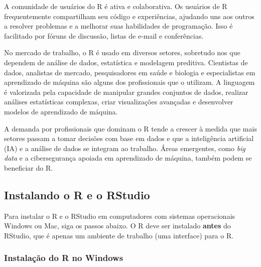 \documentclass[
]{book}
\begin{document}
A comunidade de usuários do R é ativa e colaborativa. Os usuários de R frequentemente compartilham seu código e experiências, ajudando uns aos outros a resolver problemas e a melhorar suas habilidades de programação. Isso é facilitado por fóruns de discussão, listas de e-mail e conferências.

No mercado de trabalho, o R é usado em diversos setores, sobretudo nos que dependem de análise de dados, estatística e modelagem preditiva. Cientistas de dados, analistas de mercado, pesquisadores em saúde e biologia e especialistas em aprendizado de máquina são alguns dos profissionais que o utilizam. A linguagem é valorizada pela capacidade de manipular grandes conjuntos de dados, realizar análises estatísticas complexas, criar visualizações avançadas e desenvolver modelos de aprendizado de máquina.

A demanda por profissionais que dominam o R tende a crescer à medida que mais setores passam a tomar decisões com base em dados e que a inteligência artificial (IA) e a análise de dados se integram ao trabalho. Áreas emergentes, como \emph{big data} e a cibersegurança apoiada em aprendizado de máquina, também podem se beneficiar do R.

\subsection{Instalando o R e o RStudio}\label{instalando-o-r-e-o-rstudio}

Para instalar o R e o RStudio em computadores com sistemas operacionais Windows ou Mac, siga os passos abaixo. O R deve ser instalado \textbf{antes} do RStudio, que é apenas um ambiente de trabalho (uma interface) para o R.

\subsubsection{Instalação do R no Windows}\label{instalauxe7uxe3o-do-r-no-windows}
\end{document}
